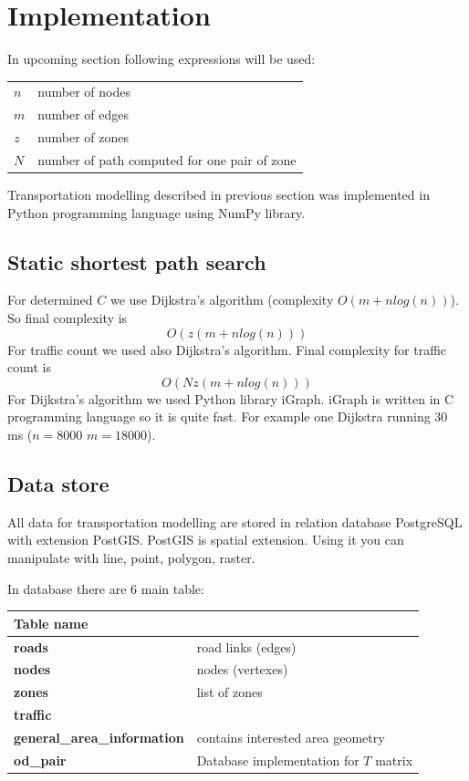 \section{Implementation}
In upcoming section following expressions will be used:

\begin{tabular}{ll}
$n$ & number of nodes\\
$m$ & number of edges \\
$z$ & number of zones\\
$N$ & number of path computed for one pair of zone
\end{tabular}

Transportation modelling described in previous section was implemented in Python programming language using NumPy library.

\subsection{Static shortest path search}
For determined $C$ we use Dijkstra's algorithm (complexity $O(m +n log(n) )$). So final complexity is 
$$O(z (m + n log(n)))$$
For traffic count we used also Dijkstra's algorithm. Final complexity for traffic count is 
$$O(N z (m + n log(n)))$$
For Dijkstra's algorithm we used Python library iGraph. iGraph is written in C programming language so it is quite fast. For example one Dijkstra running 30 ms ($n = 8000$ $m = 18000$).

\subsection{Data store}
All data for transportation modelling are stored in relation database PostgreSQL with extension PostGIS. PostGIS is spatial extension. Using it you can manipulate with line, point, polygon, raster.

In database there are 6 main table:

\begin{tabular}{|l|l|}
\hline
Table name & \\
\hline
\hline
\textbf{roads} & road links (edges)\\
\textbf{nodes} & nodes (vertexes)\\
\textbf{zones} & list of zones\\ 
\textbf{traffic} & \\
\textbf{general\_area\_information} & contains interested area geometry\\
\textbf{od\_pair} & Database implementation for $T$ matrix\\
\hline
\end{tabular}


